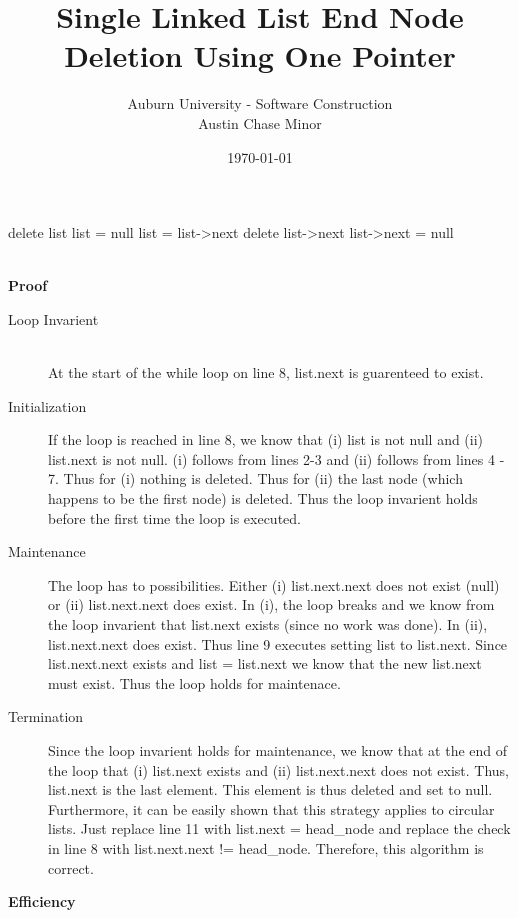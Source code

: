 \documentclass{article}
\author{Auburn University - Software Construction \\ Austin Chase Minor}
\title{Single Linked List End Node Deletion Using One
  Pointer}
\date{\today}
\begin{document}
\maketitle

\begin{algorithmic}[1]
  \State {}
  \EndIf
  \State delete list
  \State list = null
  \State {}
  \EndIf
  \State list = list-\textgreater next
  \EndWhile
  \State delete list-\textgreater next
  \State list-\textgreater next = null
  \State {}
  \EndFunction
\end{algorithmic}

\text{}\\
\textbf{Proof}
\begin{description}
\item[Loop Invarient]
  \text{}\\
  At the start of the while loop on line 8, list.next is guarenteed to
  exist.
\item[Initialization]
  \text{}
 
 If the loop is reached in line 8, we know that (i) list is not null and (ii)
 list.next is not null. (i) follows from lines 2-3 and (ii) follows from lines
 4 - 7. Thus for (i) nothing is deleted. Thus for (ii) the last node (which
 happens to be the first node) is deleted. Thus the loop invarient holds
 before the first time the loop is executed.
\item[Maintenance]
  \text{}

  The loop has to possibilities. Either (i) list.next.next does not exist
  (null) or (ii) list.next.next does exist. In (i), the loop breaks and we
  know from the loop invarient that list.next exists (since no work was
  done). In (ii), list.next.next does exist. Thus line 9 executes setting list
  to list.next. Since list.next.next exists and list = list.next we know that
  the new list.next must exist. Thus the loop holds for maintenace.
\item[Termination]
  \text{}

  Since the loop invarient holds for maintenance, we know that at the end of
  the loop that (i) list.next exists and (ii) list.next.next does not
  exist. Thus, list.next is the last element. This element is thus deleted and
  set to null. Furthermore, it can be easily shown that this strategy applies
  to circular lists. Just replace line 11 with list.next = head\_node and
  replace the check in line 8 with list.next.next != head\_node. Therefore,
  this algorithm is correct.
\end{description}
\textbf{Efficiency}\\
\end{document}
